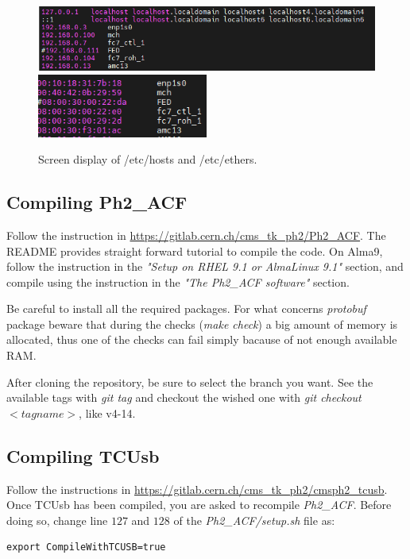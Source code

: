 \documentclass[10pt,a4paper]{article}
\begin{document}
\begin{figure}[h!]
\centering
        \includegraphics[width=\textwidth]{hosts.png}
        \includegraphics[width=0.5\textwidth]{ethers.png}
  \caption{Screen display of /etc/hosts and /etc/ethers.}
  \label{GoodHosts}
\end{figure}




\subsection{Compiling Ph2\_ACF}
Follow the instruction in \url{https://gitlab.cern.ch/cms_tk_ph2/Ph2_ACF}. 
The README provides straight forward tutorial to compile the code. On Alma9, follow the instruction in the \emph{"Setup on RHEL 9.1 or AlmaLinux 9.1"} section, and compile using the instruction in the \emph{"The Ph2\_ACF software"} section.

Be careful to install all the required packages. For what concerns {\it protobuf} package beware that during the checks (\emph{make check}) a big amount of memory is allocated, thus one of the checks can fail simply bacause of not enough available RAM.  

After cloning the repository, be sure to select the branch you want. See the available tags with \emph{git tag} and checkout the wished one with \emph{git checkout $<tagname>$}, like v4-14.


\subsection{Compiling TCUsb}
Follow the instructions in \url{https://gitlab.cern.ch/cms_tk_ph2/cmsph2_tcusb}.
Once TCUsb has been compiled, you are asked to recompile \emph{Ph2\_ACF}. Before doing so, change line $127$ and $128$ of the \emph{Ph2\_ACF/setup.sh} file as:
\begin{framed}
\begin{verbatim}
export CompileWithTCUSB=true
\end{verbatim}
\end{framed}
\end{document}
